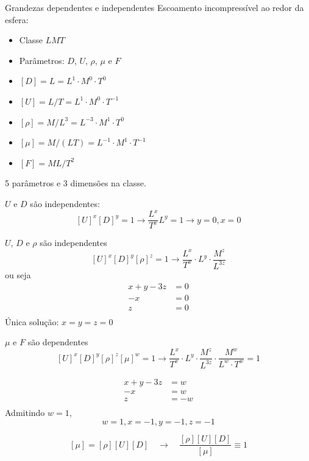 \documentclass{beamer}
\newcommand{\lra}{\ensuremath{\longrightarrow}}
\newcommand{\qrq}{\ensuremath{\quad\lra\quad}}
\begin{document}
\begin{frame}{Grandezas dependentes e independentes}
  Escoamento incompressível ao redor da esfera:
  \begin{itemize}
  \item Classe $LMT$
  \item Parâmetros: $D$, $U$, $\rho$, $\mu$ e $F$
  \item $[D] = L = L^1 \cdot M^0\cdot T^0$
  \item $[U] = L/T = L^1\cdot M^0 \cdot T^{-1}$
  \item $[\rho] = M/L^3 = L^{-3}\cdot M^1\cdot T^0$
  \item $[\mu] = M/(LT) = L^{-1}\cdot M^1\cdot T^{-1}$
  \item $[F] = ML/T^2$
  \end{itemize}
  \vspace{0.5cm}
  5 parâmetros e 3 dimensões na classe.

  $U$ e $D$ são independentes:
  \[
    [U]^x[D]^y = 1 \lra \frac{L^x}{T^x} L^y = 1\lra y=0, x=0
    \]
    
  
\end{frame}

\begin{frame}{$U$, $D$ e $\rho$ são independentes}
  \[
    [U]^x [D]^y [\rho]^z = 1 \lra \frac{L^x}{T^x} \cdot L^y \cdot \frac{M^z}{L^{3z}}
    \]
    ou seja
\[
\begin{aligned}
  x + y - 3z &= 0\\
  -x &= 0\\
  z &= 0\\
\end{aligned}
\]
Única solução: $x=y=z=0$
   
\end{frame}

\begin{frame}{$\mu$ e $F$ são dependentes}
  \[
    [U]^x [D]^y [\rho]^z [\mu]^w= 1 \lra \frac{L^x}{T^x} \cdot L^y \cdot \frac{M^z}{L^{3z}}\cdot \frac{M^w}{L^w\cdot T^w} = 1
    \]

    \[
\begin{aligned}
  x + y - 3z  &= w\\
  -x &= w\\
  z &= -w\\
\end{aligned}
\]
Admitindo $w=1$,
\[
w=1, x=-1, y=-1, z=-1
\]

\[
  [\mu] = [\rho][U][D] \qrq \frac{[\rho][U][D]}{[\mu]} \equiv 1
  \]
  

\end{frame}
\end{document}
